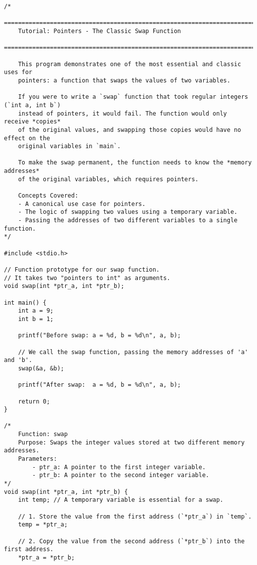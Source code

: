 \documentclass[11pt]{book}
\begin{document}
\begin{verbatim}
/*
    ================================================================================
    Tutorial: Pointers - The Classic Swap Function
    ================================================================================

    This program demonstrates one of the most essential and classic uses for
    pointers: a function that swaps the values of two variables.

    If you were to write a `swap` function that took regular integers (`int a, int b`)
    instead of pointers, it would fail. The function would only receive *copies*
    of the original values, and swapping those copies would have no effect on the
    original variables in `main`.

    To make the swap permanent, the function needs to know the *memory addresses*
    of the original variables, which requires pointers.

    Concepts Covered:
    - A canonical use case for pointers.
    - The logic of swapping two values using a temporary variable.
    - Passing the addresses of two different variables to a single function.
*/

#include <stdio.h>

// Function prototype for our swap function.
// It takes two "pointers to int" as arguments.
void swap(int *ptr_a, int *ptr_b);

int main() {
    int a = 9;
    int b = 1;

    printf("Before swap: a = %d, b = %d\n", a, b);

    // We call the swap function, passing the memory addresses of 'a' and 'b'.
    swap(&a, &b);

    printf("After swap:  a = %d, b = %d\n", a, b);

    return 0;
}

/*
    Function: swap
    Purpose: Swaps the integer values stored at two different memory addresses.
    Parameters:
        - ptr_a: A pointer to the first integer variable.
        - ptr_b: A pointer to the second integer variable.
*/
void swap(int *ptr_a, int *ptr_b) {
    int temp; // A temporary variable is essential for a swap.

    // 1. Store the value from the first address (`*ptr_a`) in `temp`.
    temp = *ptr_a;

    // 2. Copy the value from the second address (`*ptr_b`) into the first address.
    *ptr_a = *ptr_b;


\end{verbatim}
\end{document}
